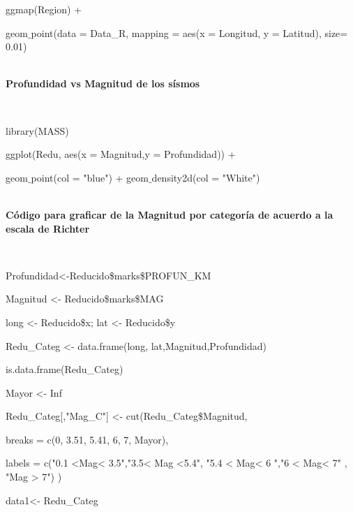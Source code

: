 \documentclass[12pt]{report}
\begin{document}
{{{{{{{{{{{		ggmap(Region) +           \vspace{-0,15 cm}
		
		geom$\_$point(data = Data\_R, mapping = 
		aes(x = Longitud, y = Latitud), size= 0.01)     }}	\\
			
			
			
				
		
		\textbf{Profundidad vs Magnitud de los sísmos}{\label{M-codigo}\\
		
		
				
					
			{ \scriptsize  { \ttfamily 
					
				library(MASS)
				
				ggplot(Redu, aes(x = Magnitud,y = Profundidad)) + 	\vspace{-0,15 cm} 
				
				geom$\_$point(col = "blue") + 	geom$\_$density2d(col = "White")       	}}\\
			    
			    
			    \textbf{Código para graficar de la Magnitud por categoría de acuerdo a la escala de Richter}{\label{M-codigo}\\
			 
			 
			 	{ \scriptsize  { \ttfamily 
			 		
			 		Profundidad<-Reducido\$marks\$PROFUN\_KM 
			 		
			 		Magnitud <- Reducido\$marks\$MAG
			 		
			 		long <- Reducido\$x; lat <- Reducido\$y
			 		
			 		Redu\_Categ <-  data.frame(long, lat,Magnitud,Profundidad)     
			 		
			 		is.data.frame(Redu\_Categ)
			 		
			 		Mayor <- Inf          %
			 		
			 		Redu\_Categ[,"Mag\_C"] <- cut(Redu\_Categ\$Magnitud,
			 		
			 		breaks = c(0,   3.51, 5.41, 6, 7, Mayor),
			 		
			 		labels = c("0.1 <Mag< 3.5","3.5< Mag <5.4", "5.4 < Mag< 6 ","6 < Mag< 7" , "Mag > 7") )
			 		
			 		
			 		data1<- Redu\_Categ
			 		
			 		
			 		
			 		
}}}}}}}}}}}}}
\end{document}
